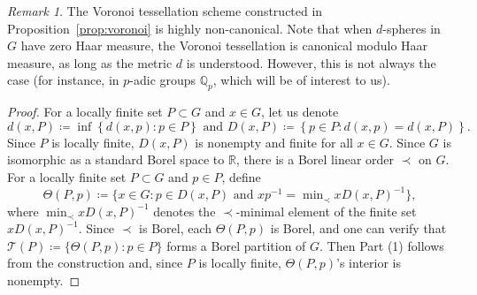 \documentclass{amsart}
\numberwithin{equation}{subsection}
\theoremstyle{remark}
\newtheorem{rem}[thm]{Remark}
\begin{document}
\begin{rem}
The Voronoi tessellation scheme constructed in Proposition~\ref{prop:voronoi} is highly non-canonical. Note that when \(d\)-spheres in \(G\) have zero Haar measure, the Voronoi tessellation is canonical modulo Haar measure, as long as the metric \(d\) is understood. However, this is not always the case (for instance, in \(p\)-adic groups \(\mathbb{Q}_{p}\), which will be of interest to us).
\end{rem}

\begin{proof}
For a locally finite set \(P\subset G\) and \(x\in G\), let us denote
\[d\left(x,P\right)\coloneqq \inf\left\{d\left(x,p\right): p\in P\right\} \text{ and }D\left(x,P\right)\coloneqq \left\{p\in P: d\left(x,p\right)=d\left(x,P\right)\right\}.\]
Since \(P\) is locally finite, \(D\left(x,P\right)\) is nonempty and finite for all \(x\in G\). Since \(G\) is isomorphic as a standard Borel space to \(\mathbb{R}\), there is a Borel linear order \(\prec\) on \(G\). For a locally finite set \(P\subset G\) and \(p\in P\), define
\[\Theta\left(P,p\right)\coloneqq\big\{x\in G:p\in D\left(x,P\right)\text{ and }xp^{-1}=\min\nolimits_{\prec}xD\left(x,P\right)^{-1}\big\},\]
where \(\min_{\prec}xD\left(x,P\right)^{-1}\) denotes the \(\prec\)-minimal element of the finite set \(xD\left(x,P\right)^{-1}\). Since \(\prec\) is Borel, each \(\Theta\left(P,p\right)\) is Borel, and one can verify that \(\mathscr{T}\left(P\right)\coloneqq \{\Theta\left(P,p\right): p\in P\}\) forms a Borel partition of \(G\). Then Part (1) follows from the construction and, since \(P\) is locally finite, \(\Theta\left(P,p\right)\)'s interior is nonempty.


\end{proof}
\end{document}
